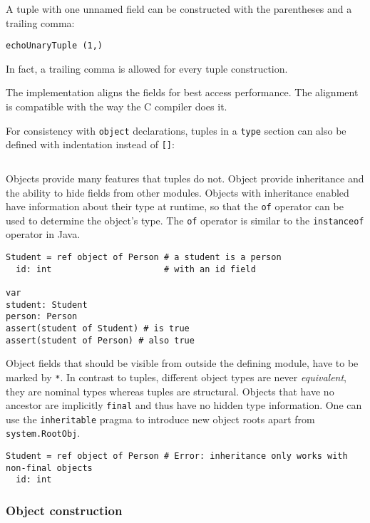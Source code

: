 A tuple with one unnamed field can be constructed with the parentheses
and a trailing comma:

\begin{verbatim}
echoUnaryTuple (1,)
\end{verbatim}

In fact, a trailing comma is allowed for every tuple construction.

The implementation aligns the fields for best access performance. The
alignment is compatible with the way the C compiler does it.

For consistency with \texttt{object} declarations, tuples in a
\texttt{type} section can also be defined with indentation instead of
\texttt{{[}{]}}:

\begin{verbatim}
\end{verbatim}

Objects provide many features that tuples do not. Object provide
inheritance and the ability to hide fields from other modules. Objects
with inheritance enabled have information about their type at runtime,
so that the \texttt{of} operator can be used to determine the object's
type. The \texttt{of} operator is similar to the \texttt{instanceof}
operator in Java.

\begin{verbatim}
Student = ref object of Person # a student is a person
  id: int                      # with an id field

var
student: Student
person: Person
assert(student of Student) # is true
assert(student of Person) # also true
\end{verbatim}

Object fields that should be visible from outside the defining module,
have to be marked by \texttt{*}. In contrast to tuples, different object
types are never \emph{equivalent}, they are nominal types whereas tuples
are structural. Objects that have no ancestor are implicitly
\texttt{final} and thus have no hidden type information. One can use the
\texttt{inheritable} pragma to introduce new object roots apart from
\texttt{system.RootObj}.

\begin{verbatim}
Student = ref object of Person # Error: inheritance only works with non-final objects
  id: int
\end{verbatim}

\hypertarget{object-construction}{%
\subsubsection{Object construction}\label{object-construction}}

